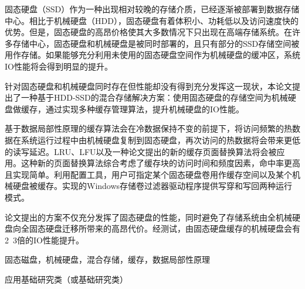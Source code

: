 
\begin{cabstract}

固态硬盘（SSD）作为一种出现相对较晚的存储介质，已经逐渐被部署到数据存储中心。相比于机械硬盘（HDD），固态硬盘有着体积小、功耗低以及访问速度快的优势。但是，固态硬盘的高昂价格使其大多数情况下只出现在高端存储系统。在许多存储中心，固态硬盘和机械硬盘是被同时部署的，且只有部分的SSD存储空间被用作存储。如果能够充分利用未使用的固态硬盘空间作为机械硬盘的缓冲区，系统IO性能将会得到明显的提升。

针对固态硬盘和机械硬盘同时存在但性能却没有得到充分发挥这一现状，本论文提出了一种基于HDD-SSD的混合存储解决方案：使用固态硬盘的存储空间为机械硬盘做缓存，通过实现多种缓存管理算法，提升机械硬盘的IO性能。

基于数据局部性原理的缓存算法会在冷数据保持不变的前提下，将访问频繁的热数据在系统运行过程中由机械硬盘复制到固态硬盘，再次访问的热数据将会带来更低的读写延迟。LRU、LFU以及一种论文提出的新的缓存页面替换算法将会被应用。这种新的页面替换算法综合考虑了缓存块的访问时间和频度因素，命中率更高且实现简单。利用配置工具，用户可指定某个固态硬盘卷用作缓存空间以及某个机械硬盘被缓存。实现的Windows存储卷过滤器驱动程序提供写穿和写回两种运行模式。

论文提出的方案不仅充分发挥了固态硬盘的性能，同时避免了存储系统由全机械硬盘向全固态硬盘迁移所带来的高昂代价。经测试，由固态硬盘缓存的机械硬盘会有2~3倍的IO性能提升。

\end{cabstract}

\begin{ckeywords}
固态磁盘，机械硬盘，混合存储，缓存，数据局部性原理
\end{ckeywords}

\begin{cthesistype}
应用基础研究类（或基础研究类）
\end{cthesistype}


